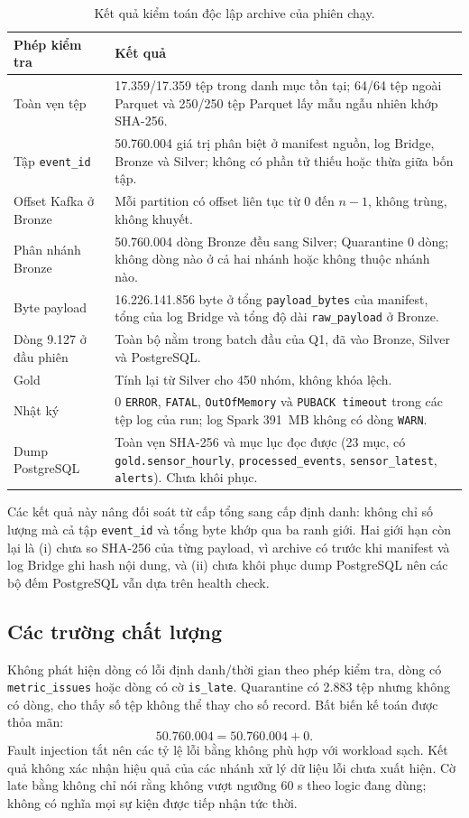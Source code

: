 \begin{table}[htbp]
\centering
\caption{Kết quả kiểm toán độc lập archive của phiên chạy.}
\label{tab:independent-audit}
\small
\begin{tabularx}{\textwidth}{>{\raggedright\arraybackslash}p{4.2cm} X}
\toprule
\textbf{Phép kiểm tra} & \textbf{Kết quả} \\
\midrule
Toàn vẹn tệp & 17.359/17.359 tệp trong danh mục tồn tại; 64/64 tệp ngoài Parquet và 250/250 tệp Parquet lấy mẫu ngẫu nhiên khớp SHA-256. \\
Tập \texttt{event\_id} & 50.760.004 giá trị phân biệt ở manifest nguồn, log Bridge, Bronze và Silver; không có phần tử thiếu hoặc thừa giữa bốn tập. \\
Offset Kafka ở Bronze & Mỗi partition có offset liên tục từ 0 đến $n-1$, không trùng, không khuyết. \\
Phân nhánh Bronze & 50.760.004 dòng Bronze đều sang Silver; Quarantine 0 dòng; không dòng nào ở cả hai nhánh hoặc không thuộc nhánh nào. \\
Byte payload & 16.226.141.856 byte ở tổng \texttt{payload\_bytes} của manifest, tổng của log Bridge và tổng độ dài \texttt{raw\_payload} ở Bronze. \\
Dòng 9.127 ở đầu phiên & Toàn bộ nằm trong batch đầu của Q1, đã vào Bronze, Silver và PostgreSQL. \\
Gold & Tính lại từ Silver cho 450 nhóm, không khóa lệch. \\
Nhật ký & 0 \texttt{ERROR}, \texttt{FATAL}, \texttt{OutOfMemory} và \texttt{PUBACK timeout} trong các tệp log của run; log Spark 391~MB không có dòng \texttt{WARN}. \\
Dump PostgreSQL & Toàn vẹn SHA-256 và mục lục đọc được (23 mục, có \texttt{gold.sensor\_hourly}, \texttt{processed\_events}, \texttt{sensor\_latest}, \texttt{alerts}). Chưa khôi phục. \\
\bottomrule
\end{tabularx}
\end{table}

Các kết quả này nâng đối soát từ cấp tổng sang cấp định danh: không chỉ số lượng mà cả tập \texttt{event\_id} và tổng byte khớp qua ba ranh giới. Hai giới hạn còn lại là (i) chưa so SHA-256 của từng payload, vì archive có trước khi manifest và log Bridge ghi hash nội dung, và (ii) chưa khôi phục dump PostgreSQL nên các bộ đếm PostgreSQL vẫn dựa trên health check.
\subsection{Các trường chất lượng}
Không phát hiện dòng có lỗi định danh/thời gian theo phép kiểm tra, dòng có \texttt{metric\_issues} hoặc dòng có cờ \texttt{is\_late}. Quarantine có 2.883 tệp nhưng không có dòng, cho thấy số tệp không thể thay cho số record. Bất biến kế toán được thỏa mãn:
\[
 50.760.004=50.760.004+0.
\]
Fault injection tắt nên các tỷ lệ lỗi bằng không phù hợp với workload sạch. Kết quả không xác nhận hiệu quả của các nhánh xử lý dữ liệu lỗi chưa xuất hiện. Cờ late bằng không chỉ nói rằng không vượt ngưỡng 60 s theo logic đang dùng; không có nghĩa mọi sự kiện được tiếp nhận tức thời.

